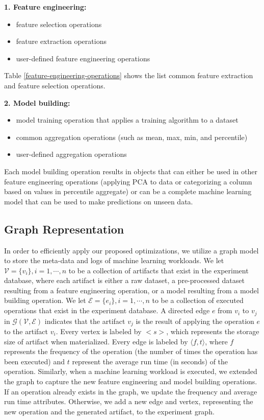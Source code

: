 \textbf{1. Feature engineering:}
\begin{itemize}
\item feature selection operations
\item feature extraction operations
\item user-defined feature engineering operations
\end{itemize}

Table \ref{feature-engineering-operations} shows the list common feature extraction and feature selection operations.

\textbf{2. Model building: }
\begin{itemize}
\item model training operation that applies a training algorithm to a dataset
\item common aggregation operations (such as mean, max, min, and percentile)
\item user-defined aggregation operations 
\end{itemize}
Each model building operation results in objects that can either be used in other feature engineering operations (applying PCA to data or categorizing a column based on values in percentile aggregate) or can be a complete machine learning model that can be used to make predictions on unseen data.

\subsection{Graph Representation}\label{sub-graph-construction}
In order to efficiently apply our proposed optimizations, we utilize a graph model to store the meta-data and logs of machine learning workloads.
We let $\mathcal{V}=\{v_i\}, i = 1, \cdots, n$ to be a collection of artifacts that exist in the experiment database, where each artifact is either a raw dataset, a pre-processed dataset resulting from a feature engineering operation, or a model resulting from a model building operation.
We let $\mathcal{E}=\{e_i\}, i = 1, \cdots, n$ to be a collection of executed operations that exist in the experiment database.
A directed edge $e$ from $v_i$ to $v_j$ in $\mathcal{G}(\mathcal{V},\mathcal{E})$ indicates that the artifact $v_j$ is the result of applying the operation $e$ to the artifact $v_i$.
Every vertex is labeled by $<s>$, which represents the storage size of artifact when materialized.
Every edge is labeled by $\langle f, t\rangle$, where $f$ represents the frequency of the operation (the number of times the operation has been executed) and $t$ represent the average run time (in seconds) of the operation.
Similarly, when a machine learning workload is executed, we extended the graph to capture the new feature engineering and model building operations.
If an operation already exists in the graph, we update the frequency and average run time attributes.
Otherwise, we add a new edge and vertex, representing the new operation and the generated artifact, to the experiment graph.


